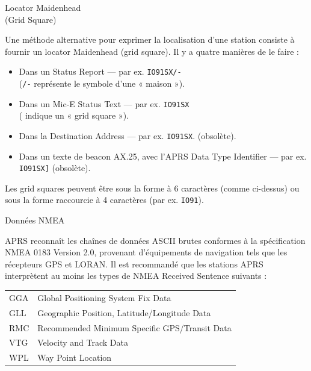 \begin{aprssideblock}{Locator Maidenhead\\(Grid Square)}
\label{locator-maidenhead-grid-square}
Une méthode alternative pour exprimer la localisation d'une station
consiste à fournir un locator Maidenhead (grid square). Il y a quatre
manières de le faire :

\begin{itemize}
\tightlist
\item
  Dans un Status Report --- par ex. \texttt{IO91SX/-}\\
  \hspace*{1.5em}(\texttt{/-} représente le symbole d'une « maison »).
\item
  Dans un Mic-E Status Text --- par ex.
  \texttt{IO91SX}\\
  \hspace*{1.5em}( indique un « grid square »).
\item
  Dans la Destination Address --- par ex. \texttt{IO91SX}. (obsolète).
\item
  Dans un texte de beacon AX.25, avec l'APRS Data Type Identifier
  \lit{{[}} --- par ex. \lit{{[}}\texttt{IO91SX{]}} (obsolète).
\end{itemize}

Les grid squares peuvent être sous la forme à 6 caractères (comme
ci-dessus) ou sous la forme raccourcie à 4 caractères (par ex.
\texttt{IO91}).
\end{aprssideblock}

\begin{aprssideblock}{Données NMEA}
\label{donnuxe9es-nmea}
APRS reconnaît les chaînes de données ASCII brutes conformes à la
spécification NMEA 0183 Version 2.0, provenant d'équipements de
navigation tels que les récepteurs GPS et LORAN. Il est recommandé que
les stations APRS interprètent au moins les types de NMEA Received
Sentence suivants :

\begin{aprsexample}
\begin{tabular}{@{}l@{\hspace{1.6em}}l@{}}
GGA & Global Positioning System Fix Data \\
GLL & Geographic Position, Latitude/Longitude Data \\
RMC & Recommended Minimum Specific GPS/Transit Data \\
VTG & Velocity and Track Data \\
WPL & Way Point Location \\
\end{tabular}
\end{aprsexample}
\end{aprssideblock}

